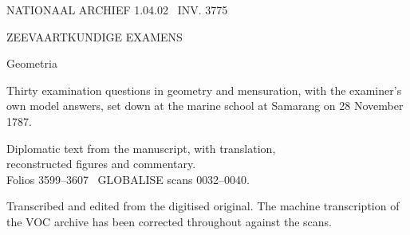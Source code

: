 \documentclass[11pt,twoside,openany]{book}
\begin{document}
\frontmatter
\thispagestyle{empty}
\vspace*{0.12\textheight}
{\color{msred}\scriptsize\MakeUppercase{Nationaal Archief 1.04.02 \textperiodcentered\ inv. 3775}}\par
{}\par
\vspace{0.20\textheight}
{\color{msmut}\small\MakeUppercase{Zeevaartkundige Examens}}\par\vspace{20pt}
{\color{msred}\fontsize{56}{56}\selectfont Geometria}\par\vspace{20pt}
{\large Thirty examination questions in geometry and mensuration, with the examiner's own model answers, set down at the marine school at Samarang on 28 November 1787.}\par
{}\par\vspace{16pt}
{\color{msmut}\small Diplomatic text from the manuscript, with translation,\\reconstructed figures and commentary.\\Folios 3599--3607 \textperiodcentered\ GLOBALISE scans 0032--0040.}\par
\vfill
{\color{msfaint}\footnotesize Transcribed and edited from the digitised original. The machine transcription of the VOC archive has been corrected throughout against the scans.}\par
\clearpage
\end{document}
